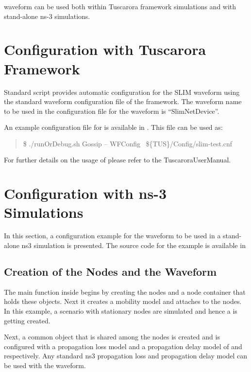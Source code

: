 
 waveform can be used both within Tuscarora framework simulations and with stand-alone ns-3 simulations.

\section{Configuration with Tuscarora Framework}
 
Standard  script provides automatic configuration for the SLIM waveform using the standard waveform configuration file of the  framework. The waveform name to be used in the configuration file for the  waveform is ``SlimNetDevice''.
 
An example configuration file for  is available in 
. 
This file can be used as:
\begin{quote}
	\$ ./runOrDebug.sh Gossip -- WFConfig ~\$\{TUS\}/Config/slim-test.cnf  \\
\end{quote}
For further details on the usage of  please refer to the TuscaroraUserManual. 

 
 
\section{Configuration with ns-3 Simulations}
 
In this section, a configuration example for the  waveform to be used in a stand-alone ns3 simulation is presented. The source code for the example is available in 
 
\subsection{Creation of the Nodes and the Waveform}

The main function inside  begins by creating the nodes and a node container that holds these objects. Next it creates a mobility model and attaches to the nodes. In this example, a scenario with stationary nodes are simulated and hence a  is getting created. 

Next, 
a common  object that is shared among the nodes 
is created and is configured with a propagation loss model and a propagation delay model of  and  respectively. 
Any standard ns3 propagation loss and propagation delay model can be used with the  waveform. 

